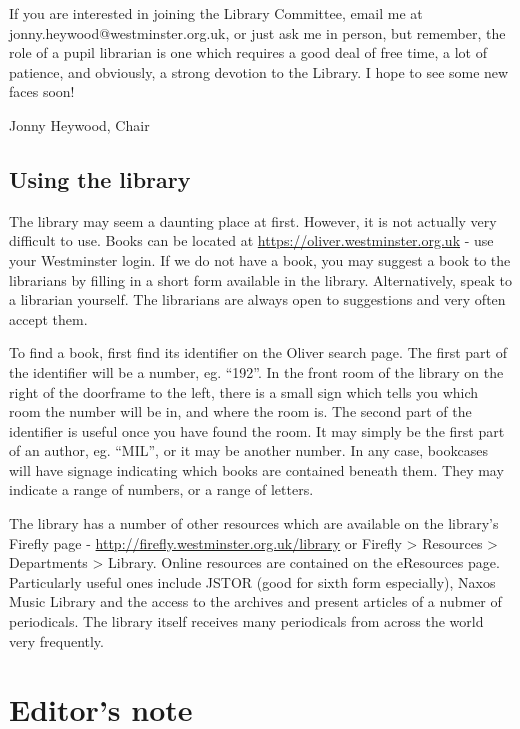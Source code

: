 \documentclass[12pt,a4paper]{report}
\begin{document}
\begin{multicols}{2}
If you are interested in joining the Library Committee, email me at jonny.heywood@westminster.org.uk, or just ask me in person, but remember, the role of a pupil librarian is one which requires a good deal of free time, a lot of patience, and obviously, a strong devotion to the Library. I hope to see some new faces soon!

Jonny Heywood, Chair

\subsection{Using the library}

The library may seem a daunting place at first. However, it is not actually very difficult to use. Books can be located at \url{https://oliver.westminster.org.uk} - use your Westminster login. If we do not have a book, you may suggest a book to the librarians by filling in a short form available in the library. Alternatively, speak to a librarian yourself. The librarians are always open to suggestions and very often accept them.

To find a book, first find its identifier on the Oliver search page. The first part of the identifier will be a number, eg. ``192''. In the front room of the library on the right of the doorframe to the left, there is a small sign which tells you which room the number will be in, and where the room is. The second part of the identifier is useful once you have found the room. It may simply be the first part of an author, eg. ``MIL'', or it may be another number. In any case, bookcases will have signage indicating which books are contained beneath them. They may indicate a range of numbers, or a range of letters.

The library has a number of other resources which are available on the library's Firefly page - \url{http://firefly.westminster.org.uk/library} or Firefly > Resources > Departments > Library. Online resources are contained on the eResources page. Particularly useful ones include JSTOR (good for sixth form especially), Naxos Music Library and the access to the archives and present articles of a nubmer of periodicals. The library itself receives many periodicals from across the world very frequently.

\end{multicols}

\section{Editor's note}
\end{document}
